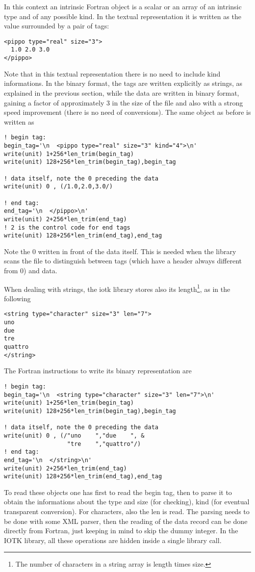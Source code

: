 \documentclass[12pt]{article}
\begin{document}
In this context an intrinsic Fortran object is a scalar
or an array of an intrinsic type and of any possible kind.
In the textual representation it is written as
the value surrounded by a pair of tags:
\begin{verbatim}
<pippo type="real" size="3">
  1.0 2.0 3.0
</pippo>
\end{verbatim}
Note that in this textual representation there is no need to include
kind informations.
In the binary format, the tags are written explicitly as strings,
as explained in the previous section,
while the data are written in binary format, gaining a factor
of approximately 3 in the size of the file and also with
a strong speed improvement (there is no need of conversions).
The same object as before is written as
\begin{verbatim}
! begin tag:
begin_tag='\n  <pippo type="real" size="3" kind="4">\n'
write(unit) 1+256*len_trim(begin_tag)
write(unit) 128+256*len_trim(begin_tag),begin_tag

! data itself, note the 0 preceding the data
write(unit) 0 , (/1.0,2.0,3.0/)

! end tag:
end_tag='\n  </pippo>\n'
write(unit) 2+256*len_trim(end_tag)
! 2 is the control code for end tags
write(unit) 128+256*len_trim(end_tag),end_tag
\end{verbatim}
Note the 0 written in front of the data itself.
This is needed when the library scans the file to distinguish
between tags (which have a header always different from 0)
and data.

When dealing with strings, the iotk library stores also its length\footnote{
The number of characters in a string array is length times size.},
as in the following
\begin{verbatim}
<string type="character" size="3" len="7">
uno
due
tre
quattro
</string>
\end{verbatim}
The Fortran instructions to write its binary representation are
\begin{verbatim}
! begin tag:
begin_tag='\n  <string type="character" size="3" len="7">\n'
write(unit) 1+256*len_trim(begin_tag)
write(unit) 128+256*len_trim(begin_tag),begin_tag

! data itself, note the 0 preceding the data
write(unit) 0 , (/"uno    ","due    ", &
                  "tre    ","quattro"/)
! end tag:
end_tag='\n  </string>\n'
write(unit) 2+256*len_trim(end_tag)
write(unit) 128+256*len_trim(end_tag),end_tag
\end{verbatim}

To read these objects one has first to read the begin tag,
then to parse it to obtain the informations about the
type and size (for checking), kind (for eventual transparent conversion).
For characters, also the len is read.
The parsing needs to be done with some XML parser, then the reading
of the data record can be done directly from Fortran, just keeping
in mind to skip the dummy integer.
In the IOTK library, all these operations are hidden inside
a single library call.
\end{document}
